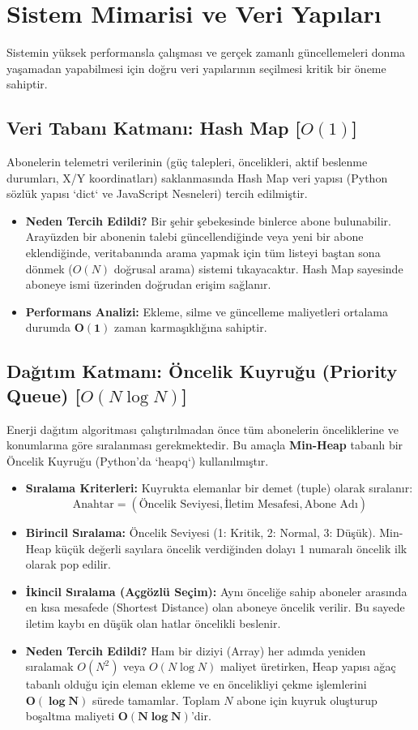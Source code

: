 \documentclass[12pt,a4paper]{article}
\begin{document}
\section{Sistem Mimarisi ve Veri Yapıları}
Sistemin yüksek performansla çalışması ve gerçek zamanlı güncellemeleri donma yaşamadan yapabilmesi için doğru veri yapılarının seçilmesi kritik bir öneme sahiptir.

\subsection{Veri Tabanı Katmanı: Hash Map [$O(1)$]}
Abonelerin telemetri verilerinin (güç talepleri, öncelikleri, aktif beslenme durumları, X/Y koordinatları) saklanmasında Hash Map veri yapısı (Python sözlük yapısı `dict` ve JavaScript Nesneleri) tercih edilmiştir. 
\begin{itemize}
    \item \textbf{Neden Tercih Edildi?} Bir şehir şebekesinde binlerce abone bulunabilir. Arayüzden bir abonenin talebi güncellendiğinde veya yeni bir abone eklendiğinde, veritabanında arama yapmak için tüm listeyi baştan sona dönmek ($O(N)$ doğrusal arama) sistemi tıkayacaktır. Hash Map sayesinde aboneye ismi üzerinden doğrudan erişim sağlanır.
    \item \textbf{Performans Analizi:} Ekleme, silme ve güncelleme maliyetleri ortalama durumda $\mathbf{O(1)}$ zaman karmaşıklığına sahiptir.
\end{itemize}

\subsection{Dağıtım Katmanı: Öncelik Kuyruğu (Priority Queue) [$O(N \log N)$]}
Enerji dağıtım algoritması çalıştırılmadan önce tüm abonelerin önceliklerine ve konumlarına göre sıralanması gerekmektedir. Bu amaçla \textbf{Min-Heap} tabanlı bir Öncelik Kuyruğu (Python'da `heapq`) kullanılmıştır.
\begin{itemize}
    \item \textbf{Sıralama Kriterleri:} Kuyrukta elemanlar bir demet (tuple) olarak sıralanır:
    \begin{equation}
        \text{Anahtar} = (\text{Öncelik Seviyesi}, \text{İletim Mesafesi}, \text{Abone Adı})
    \end{equation}
    \item \textbf{Birincil Sıralama:} Öncelik Seviyesi (1: Kritik, 2: Normal, 3: Düşük). Min-Heap küçük değerli sayılara öncelik verdiğinden dolayı 1 numaralı öncelik ilk olarak pop edilir.
    \item \textbf{İkincil Sıralama (Açgözlü Seçim):} Aynı önceliğe sahip aboneler arasında en kısa mesafede (Shortest Distance) olan aboneye öncelik verilir. Bu sayede iletim kaybı en düşük olan hatlar öncelikli beslenir.
    \item \textbf{Neden Tercih Edildi?} Ham bir diziyi (Array) her adımda yeniden sıralamak $O(N^2)$ veya $O(N \log N)$ maliyet üretirken, Heap yapısı ağaç tabanlı olduğu için eleman ekleme ve en öncelikliyi çekme işlemlerini $\mathbf{O(\log N)}$ sürede tamamlar. Toplam $N$ abone için kuyruk oluşturup boşaltma maliyeti $\mathbf{O(N \log N)}$'dir.
\end{itemize}
\end{document}
